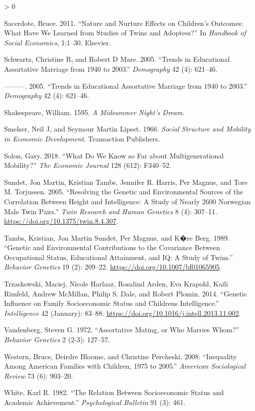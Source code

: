 \documentclass[
]{article}
\newlength{\cslhangindent}
\newenvironment{CSLReferences}[2] %
 {%
  \setlength{\parindent}{0pt}
  \ifodd #1 \everypar{\setlength{\hangindent}{\cslhangindent}}\ignorespaces\fi
  \ifnum #2 > 0
  \setlength{\parskip}{#2\baselineskip}
  \fi
 }%
 {}
\begin{document}
\begin{CSLReferences}{1}{0}
\leavevmode\hypertarget{ref-sacerdote2011nature}{}%
Sacerdote, Bruce. 2011. {``Nature and Nurture Effects on Children's Outcomes: What Have We Learned from Studies of Twins and Adoptees?''} In \emph{Handbook of Social Economics}, 1:1--30. Elsevier.

\leavevmode\hypertarget{ref-schwartz2005trends}{}%
Schwartz, Christine R, and Robert D Mare. 2005. {``Trends in Educational Assortative Marriage from 1940 to 2003.''} \emph{Demography} 42 (4): 621--46.

\leavevmode\hypertarget{ref-schwartz2005trends}{}%
---------. 2005. {``Trends in Educational Assortative Marriage from 1940 to 2003.''} \emph{Demography} 42 (4): 621--46.

\leavevmode\hypertarget{ref-shakespeare1595midsummer}{}%
Shakespeare, William. 1595. \emph{A Midsummer Night's Dream}.

\leavevmode\hypertarget{ref-smelser1966social}{}%
Smelser, Neil J, and Seymour Martin Lipset. 1966. \emph{Social Structure and Mobility in Economic Development}. Transaction Publishers.

\leavevmode\hypertarget{ref-solon2018we}{}%
Solon, Gary. 2018. {``What Do We Know so Far about Multigenerational Mobility?''} \emph{The Economic Journal} 128 (612): F340--52.

\leavevmode\hypertarget{ref-Sundet_2005}{}%
Sundet, Jon Martin, Kristian Tambs, Jennifer R. Harris, Per Magnus, and Tore M. Torjussen. 2005. {``Resolving the Genetic and Environmental Sources of the Correlation Between Height and Intelligence: A Study of Nearly 2600 Norwegian Male Twin Pairs.''} \emph{Twin Research and Human Genetics} 8 (4): 307--11. \url{https://doi.org/10.1375/twin.8.4.307}.

\leavevmode\hypertarget{ref-Tambs_1989}{}%
Tambs, Kristian, Jon Martin Sundet, Per Magnus, and K�re Berg. 1989. {``Genetic and Environmental Contributions to the Covariance Between Occupational Status, Educational Attainment, and {IQ}: A Study of Twins.''} \emph{Behavior Genetics} 19 (2): 209--22. \url{https://doi.org/10.1007/bf01065905}.

\leavevmode\hypertarget{ref-Trzaskowski_2014}{}%
Trzaskowski, Maciej, Nicole Harlaar, Rosalind Arden, Eva Krapohl, Kaili Rimfeld, Andrew McMillan, Philip S. Dale, and Robert Plomin. 2014. {``Genetic Influence on Family Socioeconomic Status and Children{{}}s Intelligence.''} \emph{Intelligence} 42 (January): 83--88. \url{https://doi.org/10.1016/j.intell.2013.11.002}.

\leavevmode\hypertarget{ref-vandenberg1972assortative}{}%
Vandenberg, Steven G. 1972. {``Assortative Mating, or Who Marries Whom?''} \emph{Behavior Genetics} 2 (2-3): 127--57.

\leavevmode\hypertarget{ref-western2008inequality}{}%
Western, Bruce, Deirdre Bloome, and Christine Percheski. 2008. {``Inequality Among American Families with Children, 1975 to 2005.''} \emph{American Sociological Review} 73 (6): 903--20.

\leavevmode\hypertarget{ref-white1982relation}{}%
White, Karl R. 1982. {``The Relation Between Socioeconomic Status and Academic Achievement.''} \emph{Psychological Bulletin} 91 (3): 461.

\end{CSLReferences}
\end{document}
